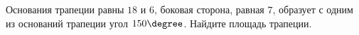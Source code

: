\begin{ex}
	\begin{condition}
		Основания трапеции равны \( 18  \) и \( 6 \), боковая сторона, равная \( 7 \), образует с одним из оснований трапеции угол \( 150\degree\). Найдите площадь трапеции.
	\end{condition}
\end{ex}